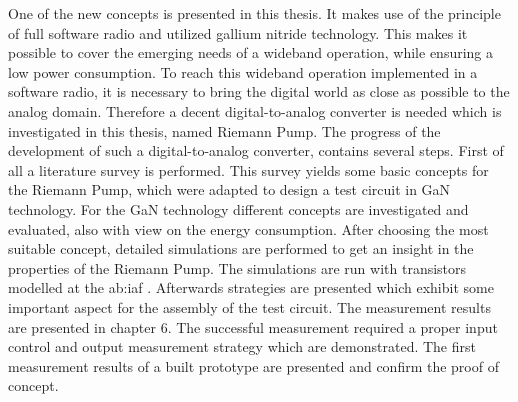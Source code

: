 One of the new concepts is presented in this thesis.
It makes use of the principle of full software radio and utilized gallium nitride technology.
This makes it possible to cover the emerging needs of a wideband operation, while ensuring a low power consumption.
To reach this wideband operation implemented in a software radio, it is necessary to bring the digital world as close as possible to the analog domain.
Therefore a decent digital-to-analog converter is needed which is investigated in this thesis, named Riemann Pump.
The progress of the development of such a digital-to-analog converter, contains several steps.
First of all a literature survey is performed.
This survey yields some basic concepts for the Riemann Pump, which were adapted to design a test circuit in GaN technology. 
For the GaN technology different concepts are investigated and evaluated, also with view on the energy consumption.
After choosing the most suitable concept, detailed simulations are performed to get an insight in the properties of the Riemann Pump.
The simulations are run with transistors modelled at the \gls{ab:iaf} \cite{Model}.
Afterwards strategies are presented which exhibit some important aspect for the assembly of the test circuit.
The measurement results are presented in chapter 6.
The successful measurement required a proper input control and output measurement strategy which are demonstrated.
The first measurement results of a built prototype are presented and confirm the proof of concept.


